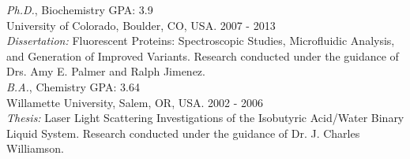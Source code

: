{\sl Ph.D.}, Biochemistry \hfill GPA: 3.9 
\\ University of Colorado, Boulder, CO, USA. \hfill 2007 - 2013 \\ 
{\it Dissertation:} Fluorescent Proteins: Spectroscopic Studies, Microfluidic Analysis, and Generation of Improved Variants.  Research conducted under the guidance of Drs. Amy E. Palmer and Ralph Jimenez. \\

{\sl B.A.}, Chemistry \hfill GPA: 3.64 
\\ Willamette University, Salem, OR, USA. \hfill 2002 - 2006\\
{\it Thesis:} Laser Light Scattering Investigations of the Isobutyric Acid/Water Binary Liquid System.  Research conducted under the guidance of Dr. J. Charles Williamson.